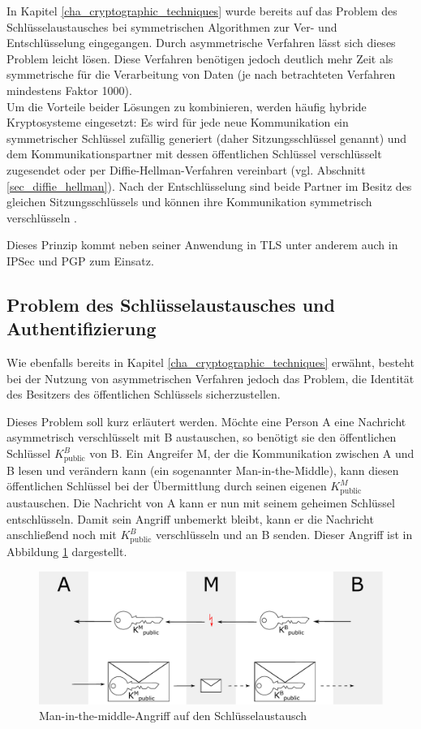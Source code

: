 In Kapitel \ref{cha_cryptographic_techniques} wurde bereits auf das Problem des Schlüsselaustausches bei symmetrischen Algorithmen zur Ver- und Entschlüsselung eingegangen. Durch asymmetrische Verfahren lässt sich dieses Problem leicht lösen. Diese Verfahren benötigen jedoch deutlich mehr Zeit als symmetrische für die Verarbeitung von Daten (je nach betrachteten Verfahren mindestens Faktor 1000). \\
Um die Vorteile beider Lösungen zu kombinieren, werden häufig hybride Kryptosysteme eingesetzt: Es wird für jede neue Kommunikation ein symmetrischer Schlüssel zufällig generiert (daher Sitzungsschlüssel genannt) und dem Kommunikationspartner mit dessen öffentlichen Schlüssel verschlüsselt zugesendet oder per Diffie-Hellman-Verfahren vereinbart (vgl. Abschnitt \ref{sec_diffie_hellman}). Nach der Entschlüsselung sind beide Partner im Besitz des gleichen Sitzungsschlüssels und können ihre Kommunikation symmetrisch verschlüsseln \cite{Schneier2006}.

Dieses Prinzip kommt neben seiner Anwendung in TLS unter anderem auch in IPSec und PGP zum Einsatz.

\subsection{Problem des Schlüsselaustausches und Authentifizierung}

Wie ebenfalls bereits in Kapitel \ref{cha_cryptographic_techniques} erwähnt, besteht bei der Nutzung von asymmetrischen Verfahren jedoch das Problem, die Identität des Besitzers des öffentlichen Schlüssels sicherzustellen.

Dieses Problem soll kurz erläutert werden. Möchte eine Person A eine Nachricht asymmetrisch verschlüsselt mit B austauschen, so benötigt sie den öffentlichen Schlüssel \(K^B_\text{public}\) von B. Ein Angreifer M, der die Kommunikation zwischen A und B lesen und verändern kann (ein sogenannter Man-in-the-Middle), kann diesen öffentlichen Schlüssel bei der Übermittlung durch seinen eigenen \(K^M_\text{public}\) austauschen. Die Nachricht von A kann er nun mit seinem geheimen Schlüssel entschlüsseln. Damit sein Angriff unbemerkt bleibt, kann er die Nachricht anschließend noch mit \(K^B_\text{public}\) verschlüsseln und an B senden. Dieser Angriff ist in Abbildung \ref{fig_mitm} dargestellt.

\begin{figure}
	\centering
	\includegraphics[width=15cm]{Diagrams/mitm.pdf} %
	\caption{Man-in-the-middle-Angriff auf den Schlüsselaustausch}
	\label{fig_mitm}
\end{figure}

